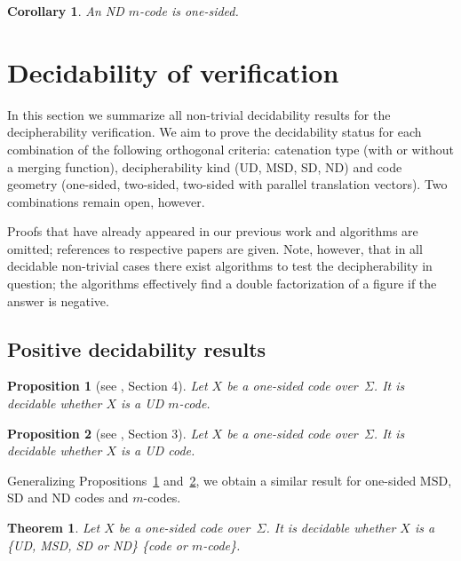 \documentclass[final,nomarks]{dmtcs-episciences}
\newtheorem{theorem}{Theorem}
\newtheorem{proposition}{Proposition}
\newtheorem{corollary}{Corollary}
\begin{document}
\begin{corollary}
An ND $m$-code is one-sided.
\end{corollary}



\section{Decidability of verification}\label{sec:dec}

In this section we summarize all non-trivial decidability
results for the decipherability verification. We aim to prove
the decidability status for each combination of the
following orthogonal criteria: catenation type (with or without
a merging function), decipherability kind (UD, MSD, SD, ND) and
code geometry (one-sided, two-sided, two-sided with parallel
translation vectors). Two combinations remain open, however.

Proofs that have already appeared in our previous work and algorithms are omitted; 
references to respective papers are given. Note,
however, that in all decidable non-trivial cases there exist
algorithms to test the decipherability in question; the
algorithms effectively find a double factorization of a figure
if the answer is negative.


\subsection{Positive decidability results}


\begin{proposition}[see \cite{KolMoc}, Section 4]\label{prop:UDm}
Let $X$ be a one-sided code over~$\Sigma$. It is decidable whether $X$
is a UD $m$-code.
\end{proposition}

\begin{proposition}[see \cite{KolRAIRO}, Section 3]\label{prop:UD}
Let $X$ be a one-sided code over~$\Sigma$. It is decidable whether $X$
is a UD code.
\end{proposition}

Generalizing Propositions~\ref{prop:UDm} and~\ref{prop:UD}, we obtain a 
similar result for one-sided MSD, SD and ND codes and $m$-codes.

\begin{theorem}\label{th:oneSide}
Let $X$ be a one-sided code over~$\Sigma$. It is decidable whether $X$
is a \{UD, MSD, SD or ND\} \{code or $m$-code\}.
\end{theorem}
\end{document}
